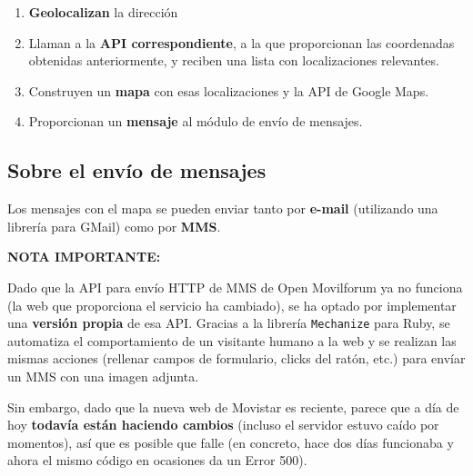 \documentclass[11pt, a4paper, oneside]{article}
\begin{document}
\begin{enumerate}
	\item \textbf{Geolocalizan} la dirección
	\item Llaman a la \textbf{API correspondiente}, a la que proporcionan las coordenadas obtenidas anteriormente, y reciben una lista con localizaciones relevantes.
	\item Construyen un \textbf{mapa} con esas localizaciones y la API de Google Maps.
	\item Proporcionan un \textbf{mensaje} al módulo de envío de mensajes.
\end{enumerate}

\subsection{Sobre el envío de mensajes}

Los mensajes con el mapa se pueden enviar tanto por \textbf{e-mail} (utilizando una librería para GMail) como por \textbf{MMS}.

\textbf{NOTA IMPORTANTE:}

Dado que la API para envío HTTP de MMS de Open Movilforum ya no funciona (la web que proporciona el servicio ha cambiado), se ha optado por implementar una \textbf{versión propia} de esa API. Gracias a la librería \texttt{Mechanize} para Ruby, se automatiza el comportamiento de un visitante humano a la web y se realizan las mismas acciones (rellenar campos de formulario, clicks del ratón, etc.) para envíar un MMS con una imagen adjunta.

Sin embargo, dado que la nueva web de Movistar es reciente, parece que a día de hoy \textbf{todavía están haciendo cambios} (incluso el servidor estuvo caído por momentos), así que es posible que falle (en concreto, hace dos días funcionaba y ahora el mismo código en ocasiones da un Error 500).


\end{document}
